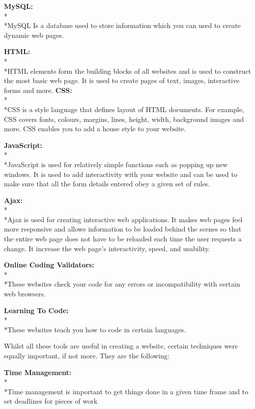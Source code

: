 \documentclass[12pt,a4paper]{article}
\begin{document}
\textbf{MySQL:} 
		\\*\\*MySQL Is a database used to store information which you can used to create
		dynamic web pages.
		
\textbf{HTML:}  
		\\*\\*HTML elements form the building blocks of all websites and is used to construct
		the most basic web page. It is used to create pages of text, images, interactive forms
		and more.
\newpage	
\textbf{CSS:}   
		\\*\\*CSS is a style language that defines layout of HTML documents. 
		For example, CSS covers fonts, colours, margins, lines, height, width, 
		background images and more. CSS enables you to add a house style to your website.

\textbf{JavaScript:} 
		\\*\\*JavaScript is used for relatively simple functions such as popping up new windows. 
		It is used to add interactivity with your website and can be used to make sure
		that all the form details entered obey a given set of rules.

\textbf{Ajax:}  
		\\*\\*Ajax is used for creating interactive web applications. It makes web pages feel more responsive 
		and allows information to be loaded behind the scenes so that the entire web page does not have to 
		be reloaded each time the user requests a change. 
		It increase the web page's interactivity, speed, and usability.
		
\textbf{Online Coding Validators:} 
		\\*\\*These websites check your code for any errors or incompatibility with certain 
		web browsers. 

\textbf{Learning To Code:}
		\\*\\*These websites teach you how to code in certain languages.
		
Whilst all these tools are useful in creating a website, certain techniques
were equally important, if not more. They are the following:

\textbf{Time Management:}
		\\*\\*Time management is important to get things done in a given time frame
		and to set deadlines for pieces of work
		
\end{document}
